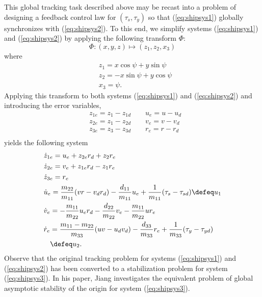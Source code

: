 \documentclass[amsthm, twocolumn]{autart}
\begin{document}
%
%
This global tracking task described above may be recast into a problem of designing a feedback control law for $(\tau_s,\tau_y)$ so that (\ref{eq:shipsys1}) globally synchronizes with (\ref{eq:shipsys2}). To this end, we simplify systems (\ref{eq:shipsys1}) and (\ref{eq:shipsys2}) by applying the following transform $\Phi$:
%
%
\begin{equation*}
\Phi:(x,y,z)\mapsto\left(z_1,z_2,x_3\right)
\end{equation*}
%
%
where
%
%
\begin{equation*}
\begin{aligned}
& z_1 = x\cos\psi+y\sin\psi \\
& z_2 = -x\sin\psi+y\cos\psi \\
& x_3 = \psi.
\end{aligned}
\end{equation*}
%
%
Applying this transform to both systems (\ref{eq:shipsys1}) and (\ref{eq:shipsys2}) and introducing the error variables,
%
%
\begin{equation*}
\begin{aligned}
& z_{1e}=z_1-z_{1d} \qquad  u_e=u-u_d \\
& z_{2e}=z_1-z_{2d} \qquad  v_e=v-v_d \\
& z_{3e}=z_3-z_{3d} \qquad  r_e=r-r_d \\
\end{aligned}
\end{equation*}
%
%
yields the following system
%
%
\begin{equation}
\begin{aligned}
& \dot{z}_{1e} =u_e+z_{2e}r_d+z_2r_e \\
& \dot{z}_{2e} =v_e+z_{1e}r_d-z_1r_e\\
& \dot{z}_{3e} =r_e \\
& \dot{u}_{e} =\frac{m_{22}}{m_{11}}(vr-v_{d}r_{d})-\frac{d_{11}}{m_{11}}u_{e}+\frac{1}{m_{11}}(\tau_s-\tau_{sd}) \defeq u_1 \\
& \dot{v}_{e} =-\frac{m_{11}}{m_{22}}u_{e}r_{d}-\frac{d_{22}}{m_{22}}v_{e}-\frac{m_{11}}{m_{22}}ur_{e} \\
& \begin{split} \dot{r}_{e} &= \frac{m_{11}-m_{22}}{m_{33}}(uv-u_{d}v_{d})-\frac{d_{33}}{m_{33}}r_{e}+\frac{1}{m_{33}}(\tau_y-\tau_{yd}) \\ & \defeq u_2. \\ \end{split}
\end{aligned}
\label{eq:shipsys3}
\end{equation}
%
%
Observe that the original tracking problem for systems (\ref{eq:shipsys1}) and (\ref{eq:shipsys2}) has been converted to a stabilization problem for system (\ref{eq:shipsys3}). In his paper, Jiang investigates the equivalent problem of global asymptotic stability of the origin for system (\ref{eq:shipsys3}).
\end{document}
